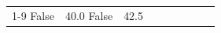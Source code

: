\begin{table}[H]
\begin{tabular}{lllrlllll}
\cline{1-9}
False & 40.0%
\cline{1-9}
False & 42.5%

\end{tabular}
\end{table}
